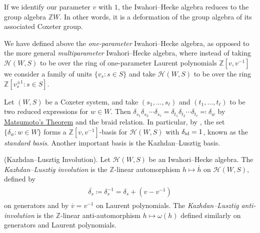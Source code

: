 \noindent\begin{remark} If we identify our parameter $v$ with $1$, the Iwahori--Hecke algebra reduces to the group algebra $\mathbb{Z}W$. In other words, it is a deformation of the group algebra of its associated Coxeter group.\\
\end{remark}

\noindent\begin{remark} We have defined above the {\em one-parameter} Iwahori--Hecke algebra, as opposed to the more general {\em multiparameter} Iwahori--Hecke algebra, where instead of taking $\mathscr{H}(W, S)$ to be over the ring of one-parameter Laurent polynomials $\mathbb{Z}[v, v^{-1}]$ we consider a family of units $\{v_s : s \in S\}$ and take $\mathscr{H}(W, S)$ to be over the ring $\mathbb{Z}[v_s^{\pm 1} : s \in S]$.\\
\end{remark}

\noindent Let $(W, S)$ be a Coxeter system, and take $(s_1, \dots, s_\ell)$ and $(t_1, \dots, t_\ell)$ to be two reduced expressions for $w \in W$. Then $\delta_{s_1}\delta_{s_2}\cdots \delta_{s_\ell} = \delta_{t_1}\delta_{t_2} \cdots \delta_{t_\ell} \eqqcolon \delta_w$ by \hyperref[Matsumoto]{Matsumoto's Theorem} and the braid relation. In particular, by \cite[Theorem 3.5]{EMTW20}, the set $\{\delta_w : w \in W\}$ forms a $\mathbb{Z}[v, v^{-1}]$-basis for $\mathscr{H}(W, S)$ with $\delta_\textup{id} = 1$, known as the {\em standard basis}. Another important basis is the Kazhdan--Lusztig basis.\\

\noindent\begin{definition}\textup{(Kazhdan--Lusztig Involution).} Let $\mathscr{H}(W, S)$ be an Iwahori--Hecke algebra. The {\em Kazhdan--Lusztig involution} is the $\mathbb{Z}$-linear automorphism $h \mapsto \overline{h}$ on $\mathscr{H}(W, S)$, defined by
\begin{align*}
\begin{split}
\overline{\delta_s} \coloneqq \delta_s^{-1} = \delta_s + (v - v^{-1})
\end{split}
\end{align*}
\noindent on generators and by $\overline{v} = v^{-1}$ on Laurent polynomials. The {\em Kazhdan--Lusztig anti-involution} is the $\mathbb{Z}$-linear anti-automorphism $h \mapsto \omega(h)$ defined similarly on generators and Laurent polynomials.\\
\end{definition}

